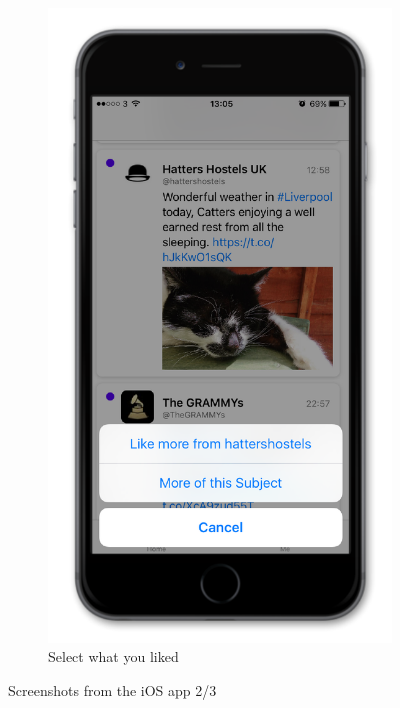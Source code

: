 \documentclass{article}
\begin{document}
\begin{figure}[H]
\begin{subfigure}[b]{0.48\textwidth}
        \includegraphics[width=\textwidth]{iphone_8_like2}
        \caption{Select what you liked}
    \end{subfigure}
    
    \vspace{1em}
    
    \caption{Screenshots from the iOS app 2/3}
\end{figure}
\end{document}
